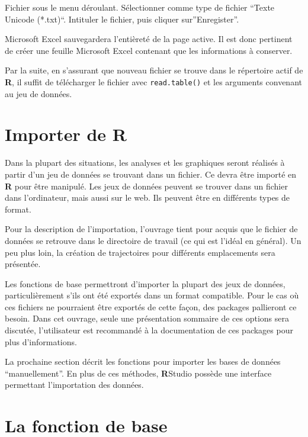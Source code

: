 \documentclass[
]{book}
\begin{document}
Fichier sous le menu déroulant. Sélectionner comme type de fichier ``Texte Unicode (*.txt)``. Intituler le fichier, puis cliquer sur''Enregister''.

Microsoft Excel sauvegardera l'entièreté de la page active. Il est donc pertinent de créer une feuille Microsoft Excel contenant que les informations à conserver.

Par la suite, en s'assurant que nouveau fichier se trouve dans le répertoire actif de \textbf{R}, il suffit de télécharger le fichier avec \texttt{read.table()} et les arguments convenant au jeu de données.

\hypertarget{importer-de-r}{%
\section{\texorpdfstring{Importer de \textbf{R}}{Importer de R}}\label{importer-de-r}}

Dans la plupart des situations, les analyses et les graphiques seront réalisés à partir d'un jeu de données se trouvant dans un fichier. Ce devra être importé en \textbf{R} pour être manipulé. Les jeux de données peuvent se trouver dans un fichier dans l'ordinateur, mais aussi sur le web. Ils peuvent être en différents types de format.

Pour la description de l'importation, l'ouvrage tient pour acquis que le fichier de données se retrouve dans le directoire de travail (ce qui est l'idéal en général). Un peu plus loin, la création de trajectoires pour différents emplacements sera présentée.

Les fonctions de base permettront d'importer la plupart des jeux de données, particulièrement s'ils ont été exportés dans un format compatible. Pour le cas où ces fichiers ne pourraient être exportés de cette façon, des packages pallieront ce besoin. Dans cet ouvrage, seule une présentation sommaire de ces options sera discutée, l'utilisateur est recommandé à la documentation de ces packages pour plus d'informations.

La prochaine section décrit les fonctions pour importer les bases de données ``manuellement''. En plus de ces méthodes, \textbf{R}Studio possède une interface permettant l'importation des données.

\hypertarget{la-fonction-de-base}{%
\section{La fonction de base}\label{la-fonction-de-base}}
\end{document}
